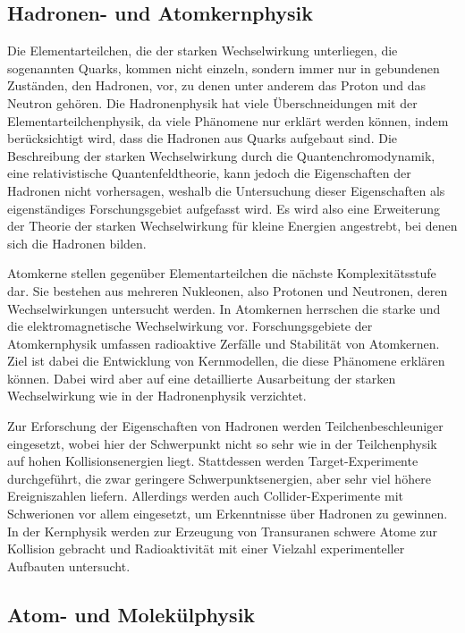 \documentclass[titlepage, parkskip=full, twocolumn, landscape]{scrartcl}
\begin{document}
\subsection{Hadronen- und Atomkernphysik}

Die Elementarteilchen, die der starken Wechselwirkung unterliegen, die sogenannten Quarks, kommen nicht einzeln, sondern immer nur in gebundenen Zuständen, den Hadronen, vor, zu denen unter anderem das Proton und das Neutron gehören. Die Hadronenphysik hat viele Überschneidungen mit der Elementarteilchenphysik, da viele Phänomene nur erklärt werden können, indem berücksichtigt wird, dass die Hadronen aus Quarks aufgebaut sind. Die Beschreibung der starken Wechselwirkung durch die Quantenchromodynamik, eine relativistische Quantenfeldtheorie, kann jedoch die Eigenschaften der Hadronen nicht vorhersagen, weshalb die Untersuchung dieser Eigenschaften als eigenständiges Forschungsgebiet aufgefasst wird. Es wird also eine Erweiterung der Theorie der starken Wechselwirkung für kleine Energien angestrebt, bei denen sich die Hadronen bilden.

Atomkerne stellen gegenüber Elementarteilchen die nächste Komplexitätsstufe dar. Sie bestehen aus mehreren Nukleonen, also Protonen und Neutronen, deren Wechselwirkungen untersucht werden. In Atomkernen herrschen die starke und die elektromagnetische Wechselwirkung vor. Forschungsgebiete der Atomkernphysik umfassen radioaktive Zerfälle und Stabilität von Atomkernen. Ziel ist dabei die Entwicklung von Kernmodellen, die diese Phänomene erklären können. Dabei wird aber auf eine detaillierte Ausarbeitung der starken Wechselwirkung wie in der Hadronenphysik verzichtet.

Zur Erforschung der Eigenschaften von Hadronen werden Teilchenbeschleuniger eingesetzt, wobei hier der Schwerpunkt nicht so sehr wie in der Teilchenphysik auf hohen Kollisionsenergien liegt. Stattdessen werden Target-Experimente durchgeführt, die zwar geringere Schwerpunktsenergien, aber sehr viel höhere Ereigniszahlen liefern. Allerdings werden auch Collider-Experimente mit Schwerionen vor allem eingesetzt, um Erkenntnisse über Hadronen zu gewinnen. In der Kernphysik werden zur Erzeugung von Transuranen schwere Atome zur Kollision gebracht und Radioaktivität mit einer Vielzahl experimenteller Aufbauten untersucht.

\subsection{Atom- und Molekülphysik}
\end{document}
